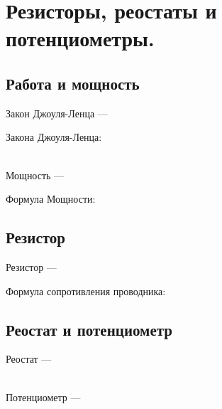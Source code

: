 \newpage

\section{Резисторы, реостаты и потенциометры.}


\subsection{Работа и мощность}

Закон Джоуля-Ленца --- \hrulefill

\hrulefill

\hrulefill

Закона Джоуля-Ленца:

\\
Мощность --- \hrulefill

\hrulefill

\hrulefill

Формула Мощности:


\subsection{Резистор}

Резистор --- \hrulefill

\hrulefill

\hrulefill

Формула сопротивления проводника:

 
\subsection{Реостат и потенциометр}

Реостат --- \hrulefill%

\hrulefill
\\
Потенциометр --- \hrulefill %

